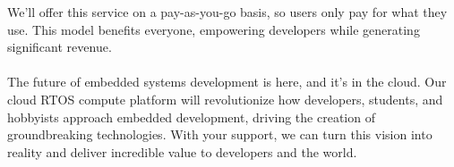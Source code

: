 \documentclass{article}
\begin{document}
We'll offer this service on a pay-as-you-go basis, so users only pay for what
they use. This model benefits everyone, empowering developers while generating
significant revenue. \\ \hfill \\

The future of embedded systems development is here, and it's in the cloud.
Our cloud RTOS compute platform will revolutionize how developers,
students, and hobbyists approach embedded development, driving the
creation of groundbreaking technologies. With your support, we can turn this
vision into reality and deliver incredible value to developers and the world.
\end{document}
